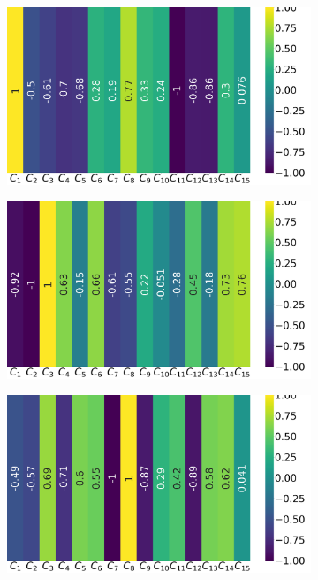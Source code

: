 \begin{figure}[!ht]
	\centering
	\begin{subfigure}{0.49\linewidth}
		\includegraphics[width=\linewidth]{img/qlp_corr/Phi_coil0.png}
	\end{subfigure}
	\begin{subfigure}{0.49\linewidth}
		\includegraphics[width=\linewidth]{img/qlp_corr/Phi_coil1.png}
	\end{subfigure}
	\begin{subfigure}{0.49\linewidth}
		\includegraphics[width=\linewidth]{img/qlp_corr/Phi_coil2.png}

\end{subfigure}
\end{figure}
